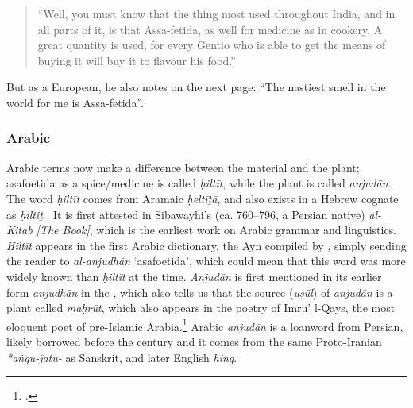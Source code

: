 \begin{quote}
    ``Well, you must know that the thing most used throughout India, and in all parts of it, is that Assa-fetida, as well for medicine as in cookery. A great quantity is used, for every Gentio who is able to get the means of buying it will buy it to flavour his food.'' \autocite[44]{garcia_da_orta_colloquies_1913}
\end{quote}

But as a European, he also notes on the next page: ``The nastiest smell in the world for me is Assa-fetida''.



\subsubsection{Arabic}



Arabic terms now make a difference between the material and the plant; asafoetida as a spice/medicine is called 
\textit{ḥiltīt}, while the plant is called  \textit{anjudān}.
The word \textit{ḥiltīt} comes from Aramaic  \textit{ḥeltīṯā}, and also exists in a Hebrew cognate as  \textit{ḥiltiṯ}
\autocites[140]{fraenkel_aramaischen_1886}[36]{low_aramaeische_1881}[Vol. 3, p. 452-455]{low_flora_1924}. It is first attested in Sibawayhi's (ca. 760--796, a Persian native) \textit{al-Kitab [The Book]}, which is the earliest work on Arabic grammar and linguistics. \textit{Ḥiltīt} appears in the first Arabic dictionary, the \gls{Ayn} compiled by \textcite{al-farahidi_kitab_786}, simply sending the reader to \textit{al-anjudhān} `asafoetida', which could mean that this word was more widely known than \textit{ḥiltīt} at the time. \textit{Anjudān} is first mentioned in its earlier form  
\textit{anjudhān} in the , which also tells us that the source (\textit{u\d{s}\={u}l}) of \textit{anjudān} is a plant called \textit{maḥrūt}, which also appears in the poetry of Imru' l-Qays, the most eloquent poet of pre-Islamic Arabia.\footcite[see][819]{ibn_manzur_lisan_1979} Arabic \textit{anjudān} is a loanword from Persian, likely borrowed before the  century and it comes from the same Proto-Iranian \textit{*aṅgu-ǰatu-} as Sanskrit, and later English \textit{hing}.





